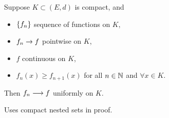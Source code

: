 \documentclass[]{article}
\begin{document}
\begin{theorem}
	\label{thm-7-13}
	Suppose $K\subset (E,d)$ is compact, and
	\begin{itemize}
		\item $\left\{ f_n \right\}$ sequence of functions on $K$,
		\item $f_n\rightarrow f$ pointwise on $K$,
		\item $f$ continuous on $K$,
		\item $f_n(x)\geq f_{n+1}(x)$ for all $n\in\mathbb{N}$ and $\forall x\in K$.
	\end{itemize}
	Then $f_n\longrightarrow f$ uniformly on $K$.
\end{theorem}
\begin{remark}
	Uses compact nested sets in proof.
\end{remark}

\newpage
\end{document}

